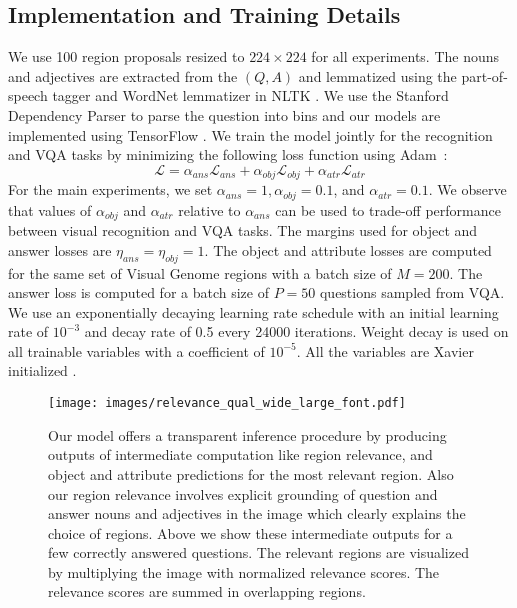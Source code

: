 \documentclass[10pt,twocolumn,letterpaper]{article}
\begin{document}
\subsection{Implementation and Training Details}
We use 100 region proposals resized to $224 \times 224$ for all experiments. The nouns and adjectives are extracted from the $(Q,A)$  and lemmatized using the part-of-speech tagger and WordNet lemmatizer in NLTK \cite{bird2009book}. We use the Stanford Dependency Parser \cite{de2006lrec} to parse the question into bins and our models are implemented using TensorFlow \cite{tensorflow2015software}. We train the model jointly for the recognition and VQA tasks by minimizing the following loss function using Adam~\cite{adamoptimizer}:
\begin{equation}
\mathcal{L} = \alpha_{ans}\mathcal{L}_{ans} + \alpha_{obj}\mathcal{L}_{obj} + \alpha_{atr}\mathcal{L}_{atr}
\end{equation}
For the main experiments, we set ${\alpha_{ans} = 1, \alpha_{obj} = 0.1}$, and ${\alpha_{atr}=0.1}$. We observe that values of $\alpha_{obj}$ and $\alpha_{atr}$ relative to $\alpha_{ans}$ can be used to trade-off performance between visual recognition and VQA tasks. The margins used for object and answer losses are $\eta_{ans}=\eta_{obj}=1$. The object and attribute losses are computed for the same set of Visual Genome regions with a batch size of $M=200$. The answer loss is computed for a batch size of $P=50$ questions sampled from VQA. We use an exponentially decaying learning rate schedule with an initial learning rate of $10^{-3}$ and decay rate of 0.5 every 24000 iterations. Weight decay is used on all trainable variables with a coefficient of $10^{-5}$. All the variables are Xavier initialized \cite{glorot2010aistats}.
\begin{figure*}[t]
\begin{center}
\texttt{[image: images/relevance\_qual\_wide\_large\_font.pdf]}
\vspace{-1.1cm}
\end{center}
  \caption{Our model offers a transparent inference procedure by producing outputs of intermediate computation like region relevance, and object and attribute predictions for the most relevant region. Also our region relevance involves explicit grounding of question and answer nouns and adjectives in the image which clearly explains the choice of regions. Above we show these intermediate outputs for a few correctly answered questions. The relevant regions are visualized by multiplying the image with normalized relevance scores. The relevance scores are summed in overlapping regions.}
\label{fig:rel_qual}
\end{figure*}
\end{document}
